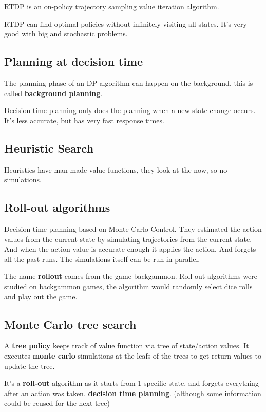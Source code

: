 RTDP is an on-policy trajectory sampling value iteration algorithm.

RTDP can find optimal policies without infinitely visiting all states. It's very good with big and stochastic problems.

\subsection{Planning at decision time}

The planning phase of an DP algorithm can happen on the background, this is called \textbf{background planning}.

Decision time planning only does the planning when a new state change occurs. It's less accurate, but has very fast response times.

\subsection{Heuristic Search}

Heuristics have man made value functions, they look at the now, so no simulations.

\subsection{Roll-out algorithms}

Decision-time planning based on Monte Carlo Control. They estimated the action values from the current state by simulating trajectories from the current state. And when the action value is accurate enough it applies the action. And forgets all the past runs. The simulations itself can be run in parallel.

The name \textbf{rollout} comes from the game backgammon. Roll-out algorithms were studied on backgammon games, the algorithm would randomly select dice rolls and play out the game.

\subsection{Monte Carlo tree search}

A \textbf{tree policy} keeps track of value function via tree of state/action values. It executes \textbf{monte carlo} simulations at the leafs of the trees to get return values to update the tree. 

It's a \textbf{roll-out} algorithm as it starts from 1 specific state, and forgets everything after an action was taken.  \textbf{decision time planning}. (although some information could be reused for the next tree)

